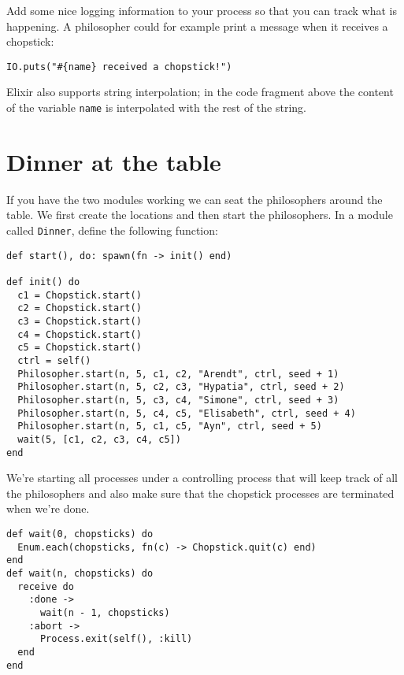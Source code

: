 \documentclass[a4paper,11pt]{article}
\begin{document}
Add some nice logging information to your process so that you can
track what is happening. A philosopher could for example print a
message when it receives a chopstick:

\begin{verbatim}
IO.puts("#{name} received a chopstick!")
\end{verbatim}

Elixir also supports string interpolation; in the code fragment above the content of the variable {\tt name} is interpolated with the rest of the string.



\section{Dinner at the table}

If you have the two modules working we can seat the philosophers
around the table. We first create the locations and then start the
philosophers. In a module called {\tt Dinner}, define the following
function:

\begin{verbatim}
def start(), do: spawn(fn -> init() end)

def init() do
  c1 = Chopstick.start()    
  c2 = Chopstick.start()
  c3 = Chopstick.start()
  c4 = Chopstick.start()
  c5 = Chopstick.start()
  ctrl = self()
  Philosopher.start(n, 5, c1, c2, "Arendt", ctrl, seed + 1)
  Philosopher.start(n, 5, c2, c3, "Hypatia", ctrl, seed + 2)
  Philosopher.start(n, 5, c3, c4, "Simone", ctrl, seed + 3)
  Philosopher.start(n, 5, c4, c5, "Elisabeth", ctrl, seed + 4)
  Philosopher.start(n, 5, c1, c5, "Ayn", ctrl, seed + 5)
  wait(5, [c1, c2, c3, c4, c5])
end
\end{verbatim}

We're starting all processes under a controlling process that will keep
track of all the philosophers and also make sure that the chopstick
processes are terminated when we're done.

\begin{verbatim}
def wait(0, chopsticks) do
  Enum.each(chopsticks, fn(c) -> Chopstick.quit(c) end)
end
def wait(n, chopsticks) do
  receive do
    :done ->
      wait(n - 1, chopsticks)
    :abort ->
      Process.exit(self(), :kill)
  end
end
\end{verbatim}
\end{document}
